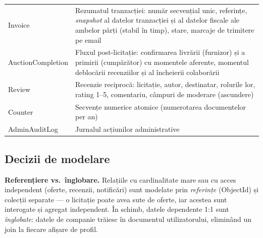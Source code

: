 \begin{table}[!ht]
\begin{tabular}{l >{\raggedright\arraybackslash}p{11.4cm}}
Invoice & Rezumatul tranzacției: număr secvențial unic, referințe, \textit{snapshot} al datelor tranzacției și al datelor fiscale ale ambelor părți (stabil în timp), stare, marcaje de trimitere pe email \\
AuctionCompletion & Fluxul post-licitație: confirmarea livrării (furnizor) și a primirii (cumpărător) cu momentele aferente, momentul deblocării recenziilor și al încheierii colaborării \\
Review & Recenzie reciprocă: licitație, autor, destinatar, rolurile lor, rating 1--5, comentariu, câmpuri de moderare (ascundere) \\
Counter & Secvențe numerice atomice (numerotarea documentelor per an) \\
AdminAuditLog & Jurnalul acțiunilor administrative \\
\bottomrule
\end{tabular}
\end{table}


\subsection{Decizii de modelare}

\textbf{Referențiere vs.\ înglobare.} Relațiile cu cardinalitate mare sau cu acces independent (oferte, recenzii, notificări) sunt modelate prin \textit{referințe} (ObjectId) și colecții separate --- o licitație poate avea sute de oferte, iar acestea sunt interogate și agregat independent. În schimb, datele dependente 1:1 sunt \textit{înglobate}: datele de companie trăiesc în documentul utilizatorului, eliminând un join la fiecare afișare de profil.

